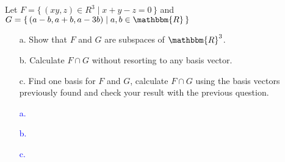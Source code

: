 \documentclass[a4paper,12pt]{article}
\newcommand{\Br}[1]{\{\, #1 \,\}}
\newcommand{\R}{\mathbbm{R}}
\begin{document}
\subsection{}
Let $F = \Br{(xy,z) \in R^3 \mid x+y-z=0}$ and $G = \Br{(a-b,a+b,a-3b) \mid a,b \in \R}$
\begin{itemize}
 \item [a.] Show that $F$ and $G$ are subspaces of $\R^3$.
 \item [b.] Calculate $F \cap G$ without resorting to any basis vector.
 \item [c.] Find one basis for $F$ and $G$, calculate $F \cap G$ using the basis vectors previously found and check your result with the previous question.
\end{itemize}
\textcolor{blue}{
\begin{itemize}
 \item [a.]
 \item [b.]
 \item [c.]
\end{itemize}
}
\end{document}
